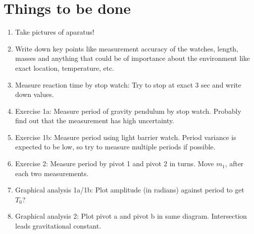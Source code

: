 \documentclass[a4paper,german,12pt,smallheadings]{scrartcl}
\begin{document}
\newpage


\section*{Things to be done}
\begin{enumerate}
  \item Take pictures of aparatus!
  \item Write down key points like measurement accuracy of the watches, length,
    masses and anything that could be of importance about the environment like
    exact location, temperature, etc.
  \item Measure reaction time by stop watch: Try to stop at exact 3 sec and
    write down values.
  \item Exercise 1a: Measure period of gravity pendulum by stop watch. Probably find out
    that the measurement has high uncertainty.
  \item Exercise 1b: Measure period using light barrier watch. Period variance is expected
    to be low, so try to measure multiple periods if possible.
  \item Exercise 2: Measure period by pivot 1 and pivot 2 in turns. Move $m_1$,
    after each two measurements.
  \item Graphical analysis 1a/1b: Plot amplitude (in radians) against period to get $T_0$?
  \item Graphical analysis 2: Plot pivot a and pivot b in same diagram.
    Intersection leads gravitational constant.
\end{enumerate}
\end{document}

